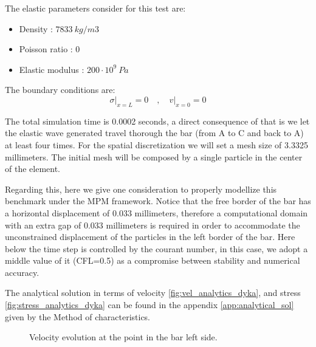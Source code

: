 The elastic parameters consider for this test are:
\begin{itemize} 
\item  Density : $7833\ kg/m3$
\item  Poisson ratio : $0$
\item  Elastic modulus : $200 \cdot 10^9\ Pa$
\end{itemize}

The boundary conditions are:
\begin{equation}
  \label{eq:3}
  \sigma \rvert_{x=L} = 0 \quad , \quad v \rvert_{x=0} = 0
\end{equation}

The total simulation time is 0.0002 seconds, a direct consequence of
that is we let the elastic wave generated travel thorough the bar
(from A to C and back to A) at least four times. For the spatial
discretization we will set a mesh size of 3.3325 millimeters. The
initial mesh will be composed by a single particle in the center of
the element.

Regarding this, here we give one consideration to properly modellize
this benchmark under the MPM framework. Notice that the free border of
the bar has a horizontal displacement of 0.033 millimeters, therefore
a computational domain with an extra gap of 0.033 millimeters is
required in order to accommodate the unconstrained displacement of the
particles in the left border of the bar. Here below the time step is
controlled by the courant number, in this case, we adopt a middle
value of it (CFL=0.5) as a compromise between stability and numerical
accuracy.  

The analytical solution in terms of velocity
\ref{fig:vel_analytics_dyka}, and stress
\ref{fig:stress_analytics_dyka} can be found in the appendix
\ref{app:analytical_sol} given by the Method of characteristics.

\begin{figure}\sidecaption
  \centering
  \caption{Velocity evolution at the point in the bar left side.}
  \label{fig:Dyka-PCE-FE}
\end{figure}

